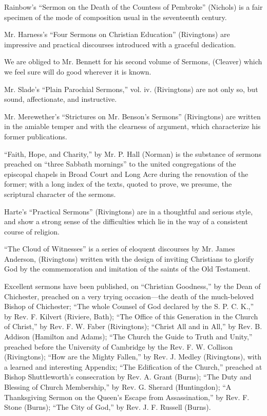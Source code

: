 Rainbow's ``Sermon on the Death of the Countess of
Pembroke'' (Nichols) is a fair specimen of the mode of composition usual
in the seventeenth century.

Mr. Harness's ``Four Sermons on Christian Education''
(Rivingtons) are impressive and practical discourses introduced with a
graceful dedication.

We are obliged to Mr. Bennett for his second volume
of Sermons, (Cleaver) which we feel sure will do good wherever it is
known.

Mr. Slade's ``Plain Parochial Sermons,'' vol. iv.
(Rivingtons) are not only so, but sound, affectionate, and instructive.

Mr. Merewether's ``Strictures on Mr. Benson's
Sermons'' (Rivingtons) are written in the amiable temper and with the
clearness of argument, which characterize his former publications.

``Faith, Hope, and Charity,'' by Mr. P. Hall (Norman)
is the substance of sermons preached on ``three Sabbath mornings'' to the
united congregations of the episcopal chapels in Broad Court and Long
Acre during the renovation of the former; with a long index of the
texts, quoted to prove, we presume, the scriptural character of the
sermons.

Harte's ``Practical Sermons'' (Rivingtons) are in a
thoughtful and serious style, and show a strong sense of the
difficulties which lie in the way of a consistent course of religion.

``The Cloud of Witnesses'' is a series of eloquent
discourses by Mr. James Anderson, (Rivingtons) written with the design
of inviting Christians to glorify God by the commemoration and imitation
of the saints of the Old Testament.

Excellent sermons have been published, on ``Christian
Goodness,'' by the Dean of Chichester, preached on a very trying
occasion—the death of the much-beloved Bishop of Chichester; ``The
whole Counsel of God declared by the S. P. C. K.,'' by Rev. F. Kilvert (Riviere,
Bath); ``The Office of this Generation in the Church of Christ,'' by Rev.
F. W. Faber (Rivingtons); ``Christ All and in All,'' by Rev. B. Addison
(Hamilton and Adams); ``The Church the Guide to Truth and Unity,''
preached before the University of Cambridge by the Rev. F. W. Collison
(Rivingtons); ``How are the Mighty Fallen,'' by Rev. J. Medley
(Rivingtons), with a learned and interesting Appendix; ``The Edification
of the Church,'' preached at Bishop Shuttleworth's consecration by Rev.
A. Grant (Burns); ``The Duty and Blessing of Church Membership,'' by Rev.
G. Sherard (Huntingdon); ``A Thanksgiving Sermon on the Queen's Escape
from Assassination,'' by Rev. F. Stone (Burns); ``The City of God,'' by
Rev. J. F. Russell (Burns).

